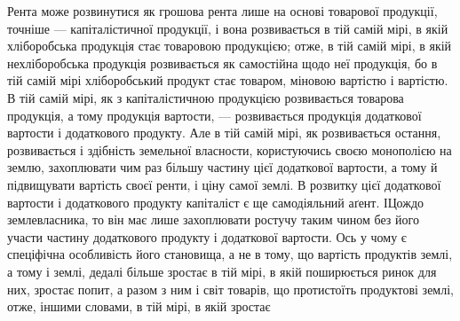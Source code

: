 Рента може розвинутися як грошова рента лише на основі товарової
продукції, точніше — капіталістичної продукції, і вона розвивається в тій самій
мірі, в якій хліборобська продукція стає товаровою продукцією; отже, в тій самій
мірі, в якій нехліборобська продукція розвивається як самостійна щодо неї продукція,
бо в тій самій мірі хліборобський продукт стає товаром, міновою вартістю
і вартістю. В тій самій мірі, як з капіталістичною продукцією розвивається товарова
продукція, а тому продукція вартости, — розвивається продукція додаткової
вартости і додаткового продукту. Але в тій самій мірі, як розвивається
остання, розвивається і здібність земельної власности, користуючись своєю монополією
на землю, захоплювати чим раз більшу частину цієї додаткової вартости,
а тому й підвищувати вартість своєї ренти, і ціну самої землі. В розвитку
цієї додаткової вартости і додаткового продукту капіталіст є ще самодіяльний
аґент. ІЦождо землевласника, то він має лише захоплювати ростучу таким
чином без його участи частину додаткового продукту і додаткової вартости.
Ось у чому є спеціфічна особливість його становища, а не в тому, що вартість
продуктів землі, а тому і землі, дедалі більше зростає в тій мірі, в якій
поширюється ринок для них, зростає попит, а разом з ним і світ товарів, що
протистоїть продуктові землі, отже, іншими словами, в тій мірі, в якій зростає
\parbreak{}  %
